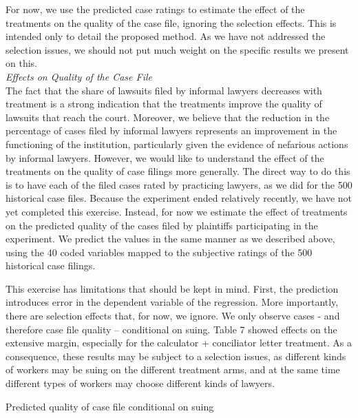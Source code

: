 \documentclass[oneside,12pt]{article}
\begin{document}
For now, we use the predicted case ratings to estimate the effect of the treatments on the quality of the case file, ignoring the selection effects. This is intended only to detail the proposed method. As we have not addressed the selection issues, we should not put much weight on the specific results we present on this. 
\\

\noindent\emph{Effects on Quality of the Case File}\\
The fact that the share of lawsuits filed by informal lawyers decreases with treatment is a strong indication that the treatments improve the quality of lawsuits that reach the court. Moreover, we believe that the reduction in the percentage of cases filed by informal lawyers represents an improvement in the functioning of the institution, particularly given the evidence of nefarious actions by informal lawyers. However, we would like to understand the effect of the treatments on the quality of case filings more generally. The direct way to do this is to have each of the filed cases rated by practicing lawyers, as we did for the 500 historical case files. Because the experiment ended relatively recently, we have not yet completed this exercise. Instead, for now we estimate the effect of treatments on the predicted quality of the cases filed by plaintiffs participating in the experiment. We predict the values in the same manner as we described above, using the 40 coded variables mapped to the subjective ratings of the 500 historical case filings. 

This exercise has limitations that should be kept in mind. First, the prediction introduces error in the dependent variable of the regression. More importantly, there are selection effects that, for now, we ignore. We only observe cases - and therefore case file quality – conditional on suing. Table 7 showed effects on the extensive margin, especially for the calculator + conciliator letter treatment. As a consequence, these results may be subject to a selection issues, as different kinds of workers may be suing on the different treatment arms, and at the same time different types of workers may choose different kinds of lawyers.
\\
\begin{table}[!ht]
    \caption{Predicted quality of case file conditional on suing} 
    \label{tab:10_TE_quality_postlasso}
    \center
    \scriptsize{}
  
\end{table}
\end{document}
